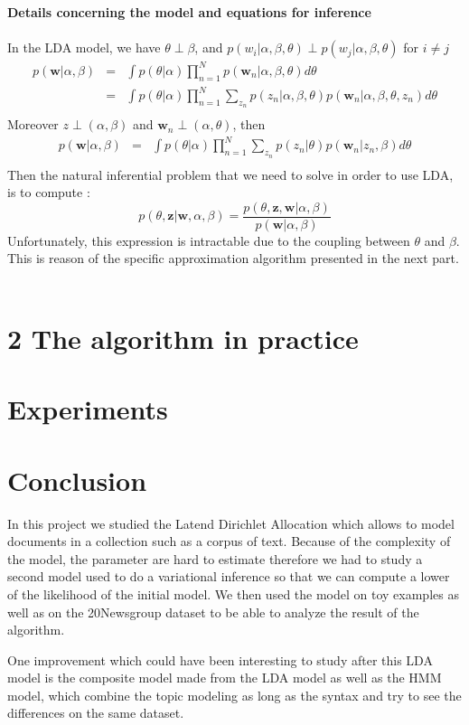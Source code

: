 \documentclass[12pt]{article}
\begin{document}
\textbf{Details concerning the model and equations for inference}~\\
~\\
In the LDA model, we have $ \theta \perp \beta$, and $p(w_{i} | \alpha, \beta, \theta) \perp p(w_{j} | \alpha, \beta, \theta)$  for $ i \neq j $
\begin{eqnarray*}
p(\textbf{w}|\alpha, \beta) & = & \int p(\theta | \alpha) \prod_{n=1}^{N} p(\textbf{w}_{n} | \alpha, \beta, \theta)d\theta\\
& = & \int  p(\theta |\alpha) \prod_{n=1}^{N}  \sum_{z_{n}}p(z_{n}|\alpha, \beta, \theta)p(\textbf{w}_{n} | \alpha, \beta, \theta, z_{n}) d\theta\\
\end{eqnarray*}
Moreover $z \perp (\alpha,\beta)$ and $\textbf{w}_{n} \perp (\alpha,\theta)$, then
\begin{eqnarray*}
p(\textbf{w}|\alpha, \beta) & = & \int p(\theta | \alpha)  \prod_{n=1}^{N}  \sum_{z_{n}}p(z_{n} |\theta)p(\textbf{w}_{n} | z_{n}, \beta) d\theta\\
\end{eqnarray*}
Then the natural inferential problem that we need to solve in order to use LDA, is to compute :
$$p(\theta, \textbf{z}|\textbf{w},\alpha,\beta)=\frac{p(\theta,\textbf{z},\textbf{w}|\alpha,\beta)}{p(\textbf{w}|\alpha,\beta)}$$
Unfortunately, this expression is intractable due to the coupling between $\theta$ and $\beta$.
This is reason of the specific approximation algorithm presented in the next part. ~\\

\section*{2 The algorithm in practice}

\section{Experiments}

\section*{Conclusion}

In this project we studied the Latend Dirichlet Allocation which allows to model documents in a collection such as a corpus of text. Because of the complexity of the model, the parameter are hard to estimate therefore we had to study a second model used to do a variational inference so that we can compute a lower of the likelihood of the initial model. We then used the model on toy examples as well as on the 20Newsgroup dataset to be able to analyze the result of the algorithm.

One improvement which could have been interesting to study after this LDA model is the composite model made from the LDA model as well as the HMM model, which combine the topic modeling as long as the syntax and try to see the differences on the same dataset. 
\end{document}

